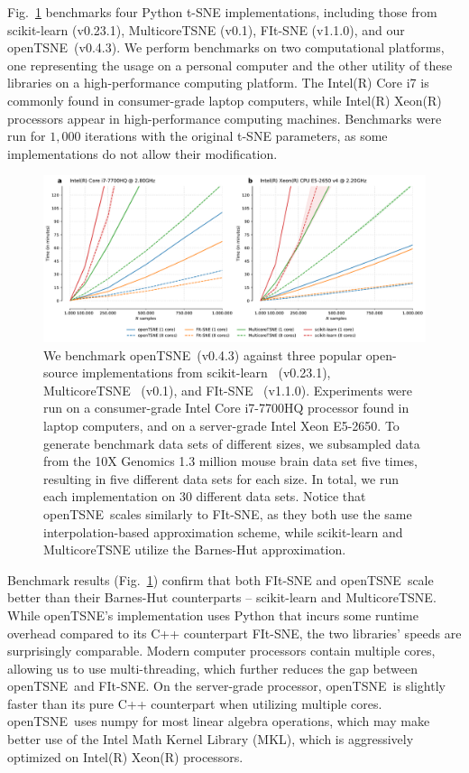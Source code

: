 \documentclass[twocolumn]{article}
\newcommand{\opentsne}{\textsf{openTSNE}}
\begin{document}
Fig.~\ref{fig:benchmarks} benchmarks four Python t-SNE implementations,
including those from \textsf{scikit-learn} (v0.23.1), \textsf{MulticoreTSNE}
(v0.1), \textsf{FIt-SNE} (v1.1.0), and our \opentsne\ (v0.4.3). We perform
benchmarks on two computational platforms, one representing the usage on a
personal computer and the other utility of these libraries on a high-performance
computing platform. The Intel(R) Core i7 is commonly found in consumer-grade
laptop computers, while Intel(R) Xeon(R) processors appear in high-performance
computing machines. Benchmarks were run for $1,000$ iterations with the original
t-SNE parameters, as some implementations do not allow their modification. 

\begin{figure}[htbp]
  \includegraphics[width=\textwidth]{benchmarks}
  \caption{\label{fig:benchmarks}
  We benchmark \opentsne\ (v0.4.3) against three popular open-source implementations
	from \textsf{scikit-learn}~\cite{pedregosa2011scikit} (v0.23.1),
	\textsf{MulticoreTSNE}~\cite{Ulyanov2016} (v0.1), and
	\textsf{FIt-SNE}~\cite{linderman2019fast} (v1.1.0). Experiments were run on a
	consumer-grade Intel Core i7-7700HQ processor found in laptop computers,
	and on a server-grade Intel Xeon E5-2650. To generate benchmark data
	sets of different sizes, we subsampled data from the 10X Genomics 1.3
	million mouse brain data set five times, resulting in five different
	data sets for each size. In total, we run each implementation on 30
	different data sets. Notice that \opentsne\ scales similarly to \textsf{FIt-SNE},
	as they both use the same interpolation-based approximation scheme,
	while \textsf{scikit-learn} and \textsf{MulticoreTSNE} utilize the Barnes-Hut
	approximation.
}
\end{figure}

Benchmark results (Fig.~\ref{fig:benchmarks}) confirm that both \textsf{FIt-SNE}
and \opentsne\ scale better than their Barnes-Hut counterparts --
\textsf{scikit-learn} and \textsf{MulticoreTSNE}. While \opentsne's
implementation uses Python that incurs some runtime overhead compared to its C++
counterpart \textsf{FIt-SNE}, the two libraries' speeds are surprisingly
comparable. Modern computer processors contain multiple cores, allowing us to
use multi-threading, which further reduces the gap between \opentsne\ and
\textsf{FIt-SNE}. On the server-grade processor, \opentsne\ is slightly faster
than its pure C++ counterpart when utilizing multiple cores. \opentsne\ uses
\textsf{numpy} for most linear algebra operations, which may make better use of
the Intel Math Kernel Library (MKL), which is aggressively optimized on Intel(R)
Xeon(R) processors.  
\end{document}
